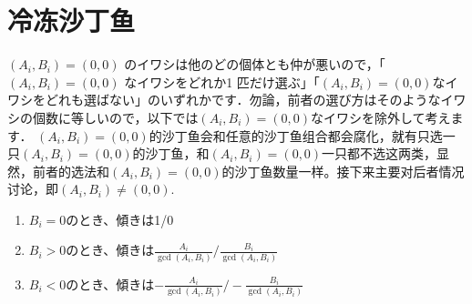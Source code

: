 \section{冷冻沙丁鱼}
\begin{Parallel}[v]{0.47\textwidth}{0.47\textwidth}

\ParallelLText
{
\( (A_i, B_i) = (0, 0) \) のイワシは他のどの個体とも仲が悪いので，「\( (A_i, B_i) = (0, 0) \) なイワシをどれか1 匹だけ選ぶ」「\( (A_i, B_i) = (0, 0) \)なイワシをどれも選ばない」のいずれかです．勿論，前者の選び方はそのようなイワシの個数に等しいので，以下では\( (A_i, B_i) = (0, 0) \)なイワシを除外して考えます．
}
\ParallelRText
{
    \( (A_i,B_i)=(0,0) \)的沙丁鱼会和任意的沙丁鱼组合都会腐化，就有只选一只\( (A_i,B_i)=(0,0) \)的沙丁鱼，和\( (A_i,B_i)=(0,0) \)一只都不选这两类，显然，前者的选法和\( (A_i,B_i)=(0,0) \)的沙丁鱼数量一样。接下来主要对后者情况讨论，即\( (A_i,B_i) \neq (0,0) \).
}
\ParallelPar

\ParallelPar

\end{Parallel}
\begin{enumerate}
    \item \( B_i=0 \)のとき、傾きは1/0

\textcolor{red}{
}

    \item \(B_i >0 \)のとき、傾きは\( \frac{A_i}{\gcd(A_i,B_i)} / \frac{B_i}{\gcd(A_i,B_i)} \)

\textcolor{red}{
}

    \item \(B_i <0 \)のとき、傾きは\( -\frac{A_i}{\gcd(A_i,B_i)} / -\frac{B_i}{\gcd(A_i,B_i)} \)

\textcolor{red}{
}

\end{enumerate}

\begin{Parallel}[v]{0.47\textwidth}{0.47\textwidth}
\end{Parallel}

